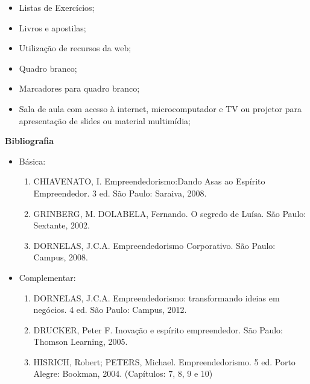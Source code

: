 \begin{itemize}
  \item Listas de Exercícios;
  \item Livros e apostilas;
  \item Utilização de recursos da web;
  \item Quadro branco;
  \item Marcadores para quadro branco;
  \item Sala de aula com acesso à internet, microcomputador e TV ou projetor para apresentação de slides ou material multimídia;
\end{itemize}


\begin{snugshade}\begin{center}\textbf{
    Bibliografia
}\end{center}\end{snugshade}

\begin{itemize} 

\item Básica:

    \begin{enumerate}

    \item CHIAVENATO, I. Empreendedorismo:Dando Asas ao Espírito 		Empreendedor. 3 ed. São Paulo: Saraiva, 2008.

    \item GRINBERG, M.
		DOLABELA, Fernando. O segredo de Luísa. São Paulo: Sextante, 2002.


    \item DORNELAS, J.C.A. Empreendedorismo Corporativo. São Paulo: Campus, 		2008.

    \end{enumerate}

\item Complementar:
	\begin{enumerate} 

    \item DORNELAS, J.C.A. Empreendedorismo: transformando ideias em 		negócios. 4 ed. São Paulo: Campus, 2012.


    \item DRUCKER, Peter F. Inovação e espírito empreendedor. São Paulo: 		Thomson Learning, 2005.

    \item HISRICH, Robert; PETERS, Michael. Empreendedorismo. 5 ed. Porto 		Alegre: Bookman, 2004. (Capítulos: 7, 8, 9 e 10)
	\end{enumerate}

\end{itemize}



